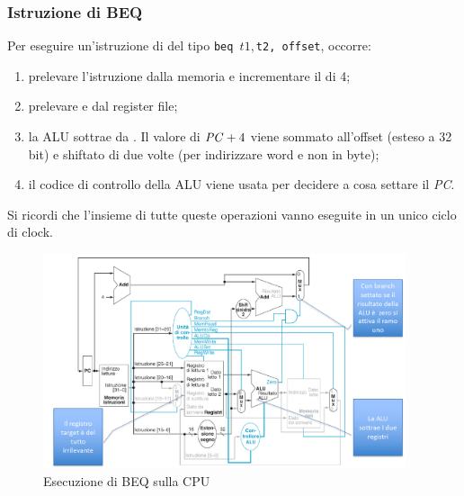 \documentclass[class=book, crop=false, oneside]{standalone}
\begin{document}
\subsubsection{Istruzione di BEQ}
Per eseguire un'istruzione di  del tipo \texttt{beq $t1, $t2, offset}, occorre:
\begin{enumerate}
	\item prelevare l’istruzione dalla memoria e incrementare il  di 4;
	\item prelevare  e  dal register file;
	\item la ALU sottrae  da . Il valore di \(\textrm{\emph{PC}}+4\) viene sommato all’offset (esteso a 32 bit) e shiftato di due volte (per indirizzare word e non in byte);
	\item il codice di controllo  della ALU viene usata per decidere a cosa settare il \emph{PC}.
\end{enumerate}
Si ricordi che l'insieme di tutte queste operazioni vanno eseguite in un unico ciclo di clock.

\begin{figure}[H]
	\centering
	\includegraphics[width=0.95\textwidth,keepaspectratio]{es_beq.png}
	\caption{Esecuzione di BEQ sulla CPU}
\end{figure}
\end{document}
